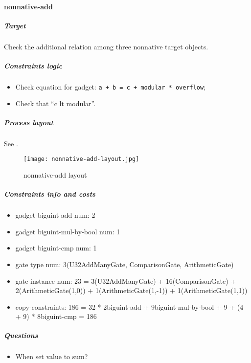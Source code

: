 \paragraph{nonnative-add}

\subparagraph{Target}
Check the additional relation among three nonnative target objects.

\subparagraph{Constraints logic}
\begin{itemize}
    \item Check equation for gadget: \verb|a + b = c + modular * overflow|;
    \item Check that ``c lt modular''.
\end{itemize}

\subparagraph{Process layout}
See .
\begin{figure}[!ht]
    \centering
    \texttt{[image: nonnative-add-layout.jpg]}
    \caption{nonnative-add layout}
    \label{fig:nonnative-add-layout}
\end{figure}

\subparagraph{Constraints info and costs}
\begin{itemize}
    \item gadget biguint-add num: 2
    \item gadget biguint-mul-by-bool num: 1
    \item gadget biguint-cmp num: 1
    \item gate type num: 3(U32AddManyGate, ComparisonGate, ArithmeticGate)
    \item gate instance num: 23 = 3(U32AddManyGate) + 16(ComparisonGate) + 2(ArithmeticGate(1,0)) + 1(ArithmeticGate(1,-1)) + 1(ArithmeticGate(1,1))
    \item copy-constraints: 186 = 32 * 2{biguint-add} + 9{biguint-mul-by-bool} + 9 + (4 + 9) * 8{biguint-cmp} = 186
\end{itemize}

\subparagraph{Questions}
\begin{itemize}
    \item When set value to sum?
\end{itemize}
